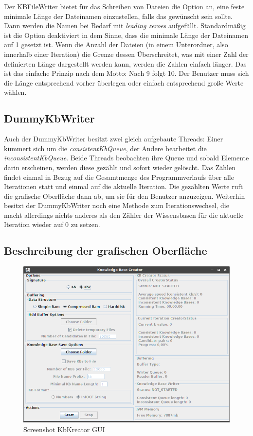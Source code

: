 \documentclass[12pt,a4paper]{article}
\begin{document}
Der KBFileWriter bietet für das Schreiben von Dateien die Option an, eine feste minimale Länge der Dateinamen einzustellen, falls das gewünscht sein sollte. Dann werden die Namen bei Bedarf mit \textit{leading zeroes} aufgefüllt. Standardmäßig ist die Option deaktiviert in dem Sinne, dass die minimale Länge der Dateinamen auf 1 gesetzt ist. Wenn die Anzahl der Dateien (in einem Unterordner, also innerhalb einer Iteration) die Grenze dessen Überschreitet, was mit einer Zahl der definierten Länge dargestellt werden kann, werden die Zahlen einfach länger. Das ist das einfache Prinzip nach dem Motto: Nach 9 folgt 10. Der Benutzer muss sich die Länge entsprechend vorher überlegen oder einfach entsprechend große Werte wählen. 


\subsection{DummyKbWriter}
\label{sec:dummywriter}
Auch der DummyKbWriter besitzt zwei gleich aufgebaute Threads: Einer kümmert sich um die \textit{consistentKbQueue}, der Andere bearbeitet die \textit{inconsistentKbQueue}. Beide Threads beobachten ihre Queue und sobald Elemente darin erscheinen, werden diese gezählt und sofort wieder gelöscht. Das Zählen findet einmal  in Bezug auf die Gesamtmenge des Programmverlaufs über alle Iterationen statt und einmal auf die aktuelle Iteration. Die gezählten Werte ruft die grafische Oberfläche dann ab, um sie für den Benutzer anzuzeigen. Weiterhin besitzt der DummyKbWriter noch eine Methode zum Iterationswechsel, die macht allerdings nichts anderes als den Zähler der Wissensbasen für die aktuelle Iteration wieder auf 0 zu setzen.


\subsection{Beschreibung der grafischen Oberfläche}


\begin{figure}
\includegraphics[width=0.97\linewidth]{bilder/KbCreator_gesamt.png}
\caption{Screenshot KbKreator GUI}
\label{pic:kbcreator_gesamt}
\end{figure}
\end{document}
